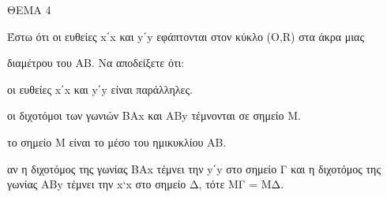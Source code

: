 
ΘΕΜΑ 4

Έστω ότι οι ευθείες x΄x και y΄y εφάπτονται στον κύκλο (Ο,R) στα άκρα μιας

διαμέτρου του ΑΒ. Να αποδείξετε ότι:

\begin{alist}
\item οι ευθείες x΄x και y΄y είναι παράλληλες. 

\item οι διχοτόμοι των γωνιών ΒΑx και ΑΒy τέμνονται σε σημείο Μ. 

\item το σημείο Μ είναι το μέσο του ημικυκλίου ΑΒ. 

\item αν η διχοτόμος της γωνίας ΒΑx τέμνει την y΄y στο σημείο Γ και η διχοτόμος της γωνίας ΑΒy τέμνει την x`x στο σημείο Δ, τότε ΜΓ = ΜΔ. 
\end{alist}
